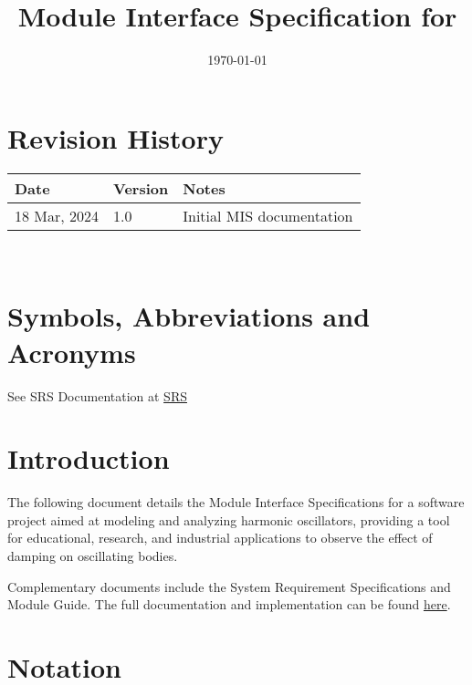 \documentclass[12pt, titlepage]{article}
\begin{document}
\title{Module Interface Specification for \progname{}}

\author{\authname}

\date{\today}

\maketitle


\section{Revision History}

\begin{tabularx}{\textwidth}{p{3cm}p{2cm}X}
\toprule {\bf Date} & {\bf Version} & {\bf Notes}\\
\midrule
18 Mar, 2024 & 1.0 & Initial MIS documentation\\
\bottomrule
\end{tabularx}

~\newpage

\section{Symbols, Abbreviations and Acronyms}

See SRS Documentation at \href{https://github.com/WaqarAwan376/Damped_Harmonic_Oscillator-CAS741/tree/main/docs/SRS}{SRS}

\newpage

\tableofcontents

\newpage


\section{Introduction}

The following document details the Module Interface Specifications for a software project aimed at modeling and analyzing harmonic oscillators,
providing a tool for educational, research, and industrial applications to observe the effect
of damping on oscillating bodies.

Complementary documents include the System Requirement Specifications
and Module Guide.  The full documentation and implementation can be
found \href{https://github.com/WaqarAwan376/Damped_Harmonic_Oscillator-CAS741/tree/main}{here}.

\section{Notation}
\end{document}
